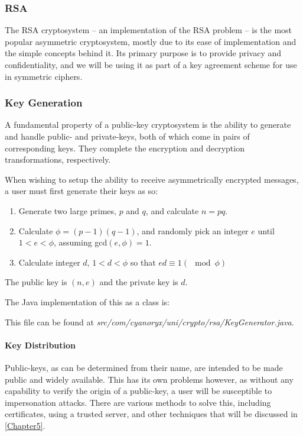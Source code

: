     \subsubsection{RSA}
    
    The RSA cryptosystem -- an implementation of the RSA problem -- is the most popular asymmetric cryptosystem, mostly due to its ease of implementation and the simple concepts behind it. Its primary purpose is to provide privacy and confidentiality, and we will be using it as part of a key agreement scheme for use in symmetric ciphers.
     
    \subsubsection{Key Generation}
    \label{subsubsec:rsa_keygen}
    
    A fundamental property of a public-key cryptosystem is the ability to generate and handle public- and private-keys, both of which come in pairs of corresponding keys. They complete the encryption and decryption transformations, respectively. 
    
    When wishing to setup the ability to receive asymmetrically encrypted messages, a user must first generate their keys as so:
    
    \begin{enumerate}
      \item Generate two large primes, $p$ and $q$, and calculate $n=pq$.
      \item Calculate $\phi = (p-1)(q-1)$, and randomly pick an integer $e$ until $1 < e < \phi$, assuming gcd$(e,\phi)=1$.
      \item Calculate integer $d$, $1 < d < \phi$ so that $ed \equiv 1 (\mod{\phi})$
    \end{enumerate}
    
    The public key is $(n,e)$ and the private key is $d$.
    
    The Java implementation of this as a class is:
    
    
    This file can be found at \emph{src/com/cyanoryx/uni/crypto/rsa/KeyGenerator.java}.
    
    \paragraph{Key Distribution} Public-keys, as can be determined from their name, are intended to be made public and widely available. This has its own problems however, as without any capability to verify the origin of a public-key, a user will be susceptible to impersonation attacks. There are various methods to solve this, including certificates, using a trusted server, and other techniques that will be discussed in \textsection\ref{Chapter5}.
    
